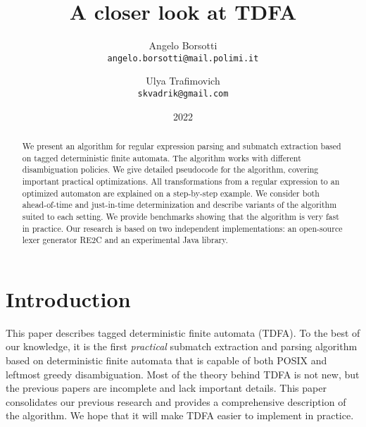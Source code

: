 \documentclass[]{article}
\begin{document}
\title{A closer look at TDFA}
\author{
    Angelo Borsotti \\
    \texttt{\small{angelo.borsotti@mail.polimi.it}}
\and
    Ulya Trafimovich \\
    \texttt{\small{skvadrik@gmail.com}}
}
\date{2022}

\maketitle

\begin{abstract}
We present an algorithm for regular expression parsing and submatch extraction
based on tagged deterministic finite automata.
The algorithm works with different disambiguation policies.
We give detailed pseudocode for the algorithm, covering important practical optimizations.
All transformations from a regular expression to an optimized automaton are explained on a step-by-step example.
We consider both ahead-of-time and just-in-time determinization
and describe variants of the algorithm suited to each setting.
We provide benchmarks showing that the algorithm is very fast in practice.
Our research is based on two independent implementations:
an open-source lexer generator RE2C
and an experimental Java library.
\end{abstract}

\section*{Introduction}
This paper describes tagged deterministic finite automata (TDFA).
To the best of our knowledge, it is the first \emph{practical} submatch extraction and parsing algorithm based on deterministic finite automata
that is capable of both POSIX and leftmost greedy disambiguation.
Most of the theory behind TDFA is not new, but the previous papers are incomplete and lack important details.
This paper consolidates our previous research
and provides a comprehensive description of the algorithm.
We hope that it will make TDFA easier to implement in practice.
\medskip
\end{document}
